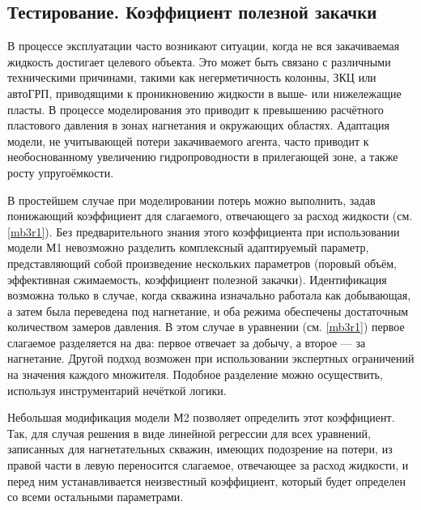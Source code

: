 \documentclass[14pt]{article}
\begin{document}
\newpage


\subsection{Тестирование. Коэффициент полезной закачки}
В процессе эксплуатации часто возникают ситуации, когда не вся закачиваемая жидкость достигает целевого объекта. Это может быть связано с различными техническими причинами, такими как негерметичность колонны, ЗКЦ или автоГРП, приводящими к проникновению жидкости в выше- или нижележащие пласты.
В процессе моделирования это приводит к превышению расчётного пластового давления в зонах нагнетания и окружающих областях. Адаптация модели, не учитывающей потери закачиваемого агента, часто приводит к необоснованному увеличению гидропроводности в прилегающей зоне, а также росту упругоёмкости.

В простейшем случае при моделировании потерь можно выполнить, задав понижающий коэффициент для слагаемого, отвечающего за расход жидкости (см. \ref{mb3r1}). Без предварительного знания этого коэффициента при использовании модели М1 невозможно разделить комплексный адаптируемый параметр, представляющий собой произведение нескольких параметров (поровый объём, эффективная сжимаемость, коэффициент полезной закачки). Идентификация возможна только в случае, когда скважина изначально работала как добывающая, а затем была переведена под нагнетание, и оба режима обеспечены достаточным количеством замеров давления. В этом случае в уравнении (см. \ref{mb3r1}) первое слагаемое разделяется на два: первое отвечает за добычу, а второе — за нагнетание.
Другой подход возможен при использовании экспертных ограничений на значения каждого множителя. Подобное разделение можно осуществить, используя инструментарий нечёткой логики.

Небольшая модификация модели М2 позволяет определить этот коэффициент. Так, для случая решения в виде линейной регрессии для всех уравнений, записанных для нагнетательных скважин, имеющих подозрение на потери, из правой части в левую переносится слагаемое, отвечающее за расход жидкости, и перед ним устанавливается неизвестный коэффициент, который будет определен со всеми остальными параметрами.
\end{document}
